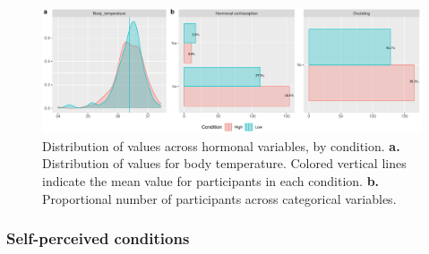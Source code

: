 \documentclass[
  bookmarksnumbered]{article}
\begin{document}
\begin{figure}
\centering
\includegraphics{Supplementary_material_files/figure-latex/hormone-desc-plot-1.pdf}
\caption{\label{fig:hormone-desc-plot}Distribution of values across hormonal variables, by condition. \textbf{a.} Distribution of values for body temperature. Colored vertical lines indicate the mean value for participants in each condition. \textbf{b.} Proportional number of participants across categorical variables.}
\end{figure}

\subsubsection{Self-perceived conditions}\label{self-perceived-conditions}
\end{document}
